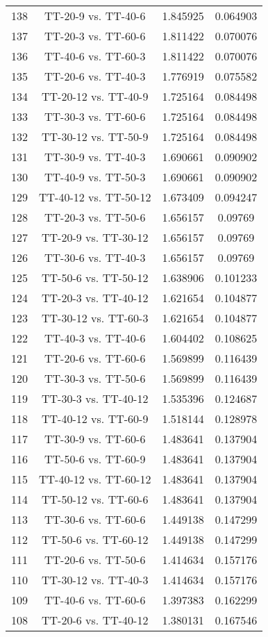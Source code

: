 \documentclass[a4paper,10pt]{article}
\begin{document}
\begin{landscape}
\begin{table}[!htp]
\begin{tabular}{cccc}
138&TT-20-9 vs. TT-40-6&1.845925&0.064903\\
137&TT-20-3 vs. TT-60-6&1.811422&0.070076\\
136&TT-40-6 vs. TT-60-3&1.811422&0.070076\\
135&TT-20-6 vs. TT-40-3&1.776919&0.075582\\
134&TT-20-12 vs. TT-40-9&1.725164&0.084498\\
133&TT-30-3 vs. TT-60-6&1.725164&0.084498\\
132&TT-30-12 vs. TT-50-9&1.725164&0.084498\\
131&TT-30-9 vs. TT-40-3&1.690661&0.090902\\
130&TT-40-9 vs. TT-50-3&1.690661&0.090902\\
129&TT-40-12 vs. TT-50-12&1.673409&0.094247\\
128&TT-20-3 vs. TT-50-6&1.656157&0.09769\\
127&TT-20-9 vs. TT-30-12&1.656157&0.09769\\
126&TT-30-6 vs. TT-40-3&1.656157&0.09769\\
125&TT-50-6 vs. TT-50-12&1.638906&0.101233\\
124&TT-20-3 vs. TT-40-12&1.621654&0.104877\\
123&TT-30-12 vs. TT-60-3&1.621654&0.104877\\
122&TT-40-3 vs. TT-40-6&1.604402&0.108625\\
121&TT-20-6 vs. TT-60-6&1.569899&0.116439\\
120&TT-30-3 vs. TT-50-6&1.569899&0.116439\\
119&TT-30-3 vs. TT-40-12&1.535396&0.124687\\
118&TT-40-12 vs. TT-60-9&1.518144&0.128978\\
117&TT-30-9 vs. TT-60-6&1.483641&0.137904\\
116&TT-50-6 vs. TT-60-9&1.483641&0.137904\\
115&TT-40-12 vs. TT-60-12&1.483641&0.137904\\
114&TT-50-12 vs. TT-60-6&1.483641&0.137904\\
113&TT-30-6 vs. TT-60-6&1.449138&0.147299\\
112&TT-50-6 vs. TT-60-12&1.449138&0.147299\\
111&TT-20-6 vs. TT-50-6&1.414634&0.157176\\
110&TT-30-12 vs. TT-40-3&1.414634&0.157176\\
109&TT-40-6 vs. TT-60-6&1.397383&0.162299\\
108&TT-20-6 vs. TT-40-12&1.380131&0.167546\\

\end{tabular}
\end{table}
\end{landscape}
\end{document}
